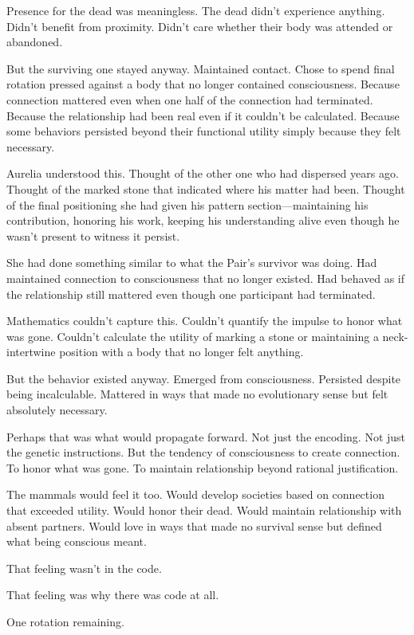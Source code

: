 Presence for the dead was meaningless. The dead didn't experience anything. Didn't benefit from proximity. Didn't care whether their body was attended or abandoned.

But the surviving one stayed anyway. Maintained contact. Chose to spend final rotation pressed against a body that no longer contained consciousness. Because connection mattered even when one half of the connection had terminated. Because the relationship had been real even if it couldn't be calculated. Because some behaviors persisted beyond their functional utility simply because they felt necessary.

Aurelia understood this. Thought of the other one who had dispersed years ago. Thought of the marked stone that indicated where his matter had been. Thought of the final positioning she had given his pattern section—maintaining his contribution, honoring his work, keeping his understanding alive even though he wasn't present to witness it persist.

She had done something similar to what the Pair's survivor was doing. Had maintained connection to consciousness that no longer existed. Had behaved as if the relationship still mattered even though one participant had terminated.

Mathematics couldn't capture this. Couldn't quantify the impulse to honor what was gone. Couldn't calculate the utility of marking a stone or maintaining a neck-intertwine position with a body that no longer felt anything.

But the behavior existed anyway. Emerged from consciousness. Persisted despite being incalculable. Mattered in ways that made no evolutionary sense but felt absolutely necessary.

Perhaps that was what would propagate forward. Not just the encoding. Not just the genetic instructions. But the tendency of consciousness to create connection. To honor what was gone. To maintain relationship beyond rational justification.

The mammals would feel it too. Would develop societies based on connection that exceeded utility. Would honor their dead. Would maintain relationship with absent partners. Would love in ways that made no survival sense but defined what being conscious meant.

That feeling wasn't in the code.

That feeling was why there was code at all.

\scenebreak

One rotation remaining.

